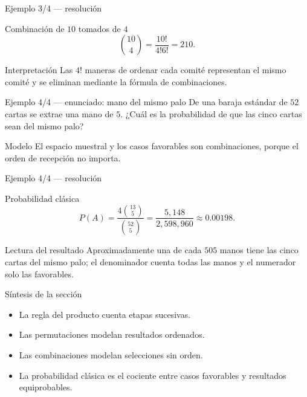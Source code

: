 \documentclass[10pt,aspectratio=169]{beamer}
\begin{document}
\begin{frame}{Ejemplo 3/4 --- resolución}
  \small
  \begin{block}{Combinación de $10$ tomados de $4$}
    \[
      \binom{10}{4}=\frac{10!}{4!6!}=210.
    \]
  \end{block}
  \begin{exampleblock}{Interpretación}
    Las $4!$ maneras de ordenar cada comité representan el mismo comité y se
    eliminan mediante la fórmula de combinaciones.
  \end{exampleblock}
\end{frame}

\begin{frame}{Ejemplo 4/4 --- enunciado: mano del mismo palo}
  \small
  De una baraja estándar de $52$ cartas se extrae una mano de $5$. ¿Cuál es
  la probabilidad de que las cinco cartas sean del mismo palo?
  \vfill
  \begin{alertblock}{Modelo}
    El espacio muestral y los casos favorables son combinaciones, porque el
    orden de recepción no importa.
  \end{alertblock}
\end{frame}

\begin{frame}{Ejemplo 4/4 --- resolución}
  \footnotesize
  \begin{block}{Probabilidad clásica}
    \[
      P(A)=\frac{4\binom{13}{5}}{\binom{52}{5}}
      =\frac{5{,}148}{2{,}598{,}960}\approx0.00198.
    \]
  \end{block}
  \begin{exampleblock}{Lectura del resultado}
    Aproximadamente una de cada $505$ manos tiene las cinco cartas del mismo
    palo; el denominador cuenta todas las manos y el numerador solo las
    favorables.
  \end{exampleblock}
\end{frame}

\begin{frame}{Síntesis de la sección}
  \small
  \begin{itemize}\itemsep=0.12cm
    \item La regla del producto cuenta etapas sucesivas.
    \item Las permutaciones modelan resultados ordenados.
    \item Las combinaciones modelan selecciones sin orden.
    \item La probabilidad clásica es el cociente entre casos favorables y
      resultados equiprobables.
  \end{itemize}
\end{frame}
\end{document}

